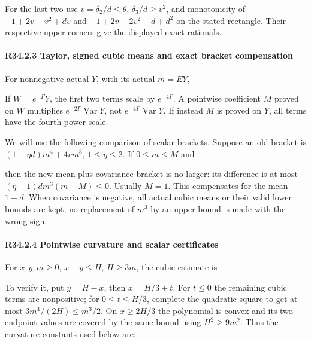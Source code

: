 For the last two use \(v=\delta_2/d\le\theta\), \(\delta_3/d\ge v^2\),
and monotonicity of \(-1+2v-v^2+dv\) and
\(-1+2v-2v^2+d+d^2\) on the stated rectangle. Their respective
upper corners give the displayed exact rationals.

\paragraph{R34.2.3 Taylor, signed cubic means and exact bracket compensation}

For nonnegative actual \(Y\), with its actual \(m=EY\),


If \(W=e^{-\Gamma}Y\), the first two terms scale by \(e^{-4\Gamma}\).
A pointwise coefficient \(M\) proved on \(W\) multiplies
\(e^{-2\Gamma}\operatorname{\operatorname{Var}}Y\), not \(e^{-4\Gamma}\operatorname{\operatorname{Var}}Y\).
If instead \(M\) is proved on \(Y\), all terms have the fourth-power scale.

We will use the following comparison of scalar brackets. Suppose an old bracket
is \((1-\eta d)m^4+4vm^3\), \(1\le\eta\le2\). If \(0\le m\le M\)
and


then the new mean-plus-covariance bracket is no larger: its difference is
at most \((\eta-1)d m^3(m-M)\le0\). Usually \(M=1\).
This compensates for the mean \(1-d\). When covariance is negative,
all actual cubic means or their valid lower bounds are kept; no replacement
of \(m^3\) by an upper bound is made with the wrong sign.

\paragraph{R34.2.4 Pointwise curvature and scalar certificates}

For \(x,\allowbreak  y,\allowbreak  m\ge0\), \(x+y\le H\), \(H\ge3m\), the cubic estimate is


To verify it, put \(y=H-x\), then \(x=H/3+t\). For \(t\le0\) the
remaining cubic terms are nonpositive; for \(0\le t\le H/3\), complete
the quadratic square to get at most \(3m^4/(2H)\le m^3/2\).
On \(x\ge2H/3\) the polynomial is convex and its two endpoint values
are covered by the same bound using \(H^2\ge9m^2\).
Thus the curvature constants used below are:


